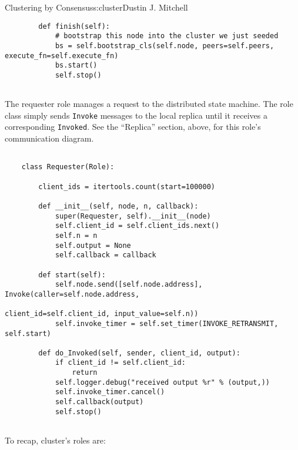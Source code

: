 \begin{aosachapter}{Clustering by Consensus}{s:cluster}{Dustin J. Mitchell}
\begin{verbatim}
        def finish(self):
            # bootstrap this node into the cluster we just seeded
            bs = self.bootstrap_cls(self.node, peers=self.peers, execute_fn=self.execute_fn)
            bs.start()
            self.stop()
    
\end{verbatim}

\label{requester}

The requester role manages a request to the distributed state machine.
The role class simply sends \texttt{Invoke} messages to the local
replica until it receives a corresponding \texttt{Invoked}. See the
``Replica'' section, above, for this role's communication diagram.

\begin{verbatim}

    class Requester(Role):
    
        client_ids = itertools.count(start=100000)
    
        def __init__(self, node, n, callback):
            super(Requester, self).__init__(node)
            self.client_id = self.client_ids.next()
            self.n = n
            self.output = None
            self.callback = callback
    
        def start(self):
            self.node.send([self.node.address], Invoke(caller=self.node.address,
                                                       client_id=self.client_id, input_value=self.n))
            self.invoke_timer = self.set_timer(INVOKE_RETRANSMIT, self.start)
    
        def do_Invoked(self, sender, client_id, output):
            if client_id != self.client_id:
                return
            self.logger.debug("received output %r" % (output,))
            self.invoke_timer.cancel()
            self.callback(output)
            self.stop()
    
\end{verbatim}

\label{summary}

To recap, cluster's roles are:

\begin{aosaitemize}


\end{aosaitemize}
\end{aosachapter}
